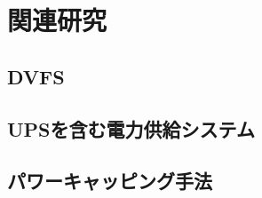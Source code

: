 \chapter{関連研究}
\label{chap:background}



\section{DVFS}
\label{sec:dvfs}


\section{UPSを含む電力供給システム}
\label{sec:ups}


\section{パワーキャッピング手法}
\label{sec:capping}

